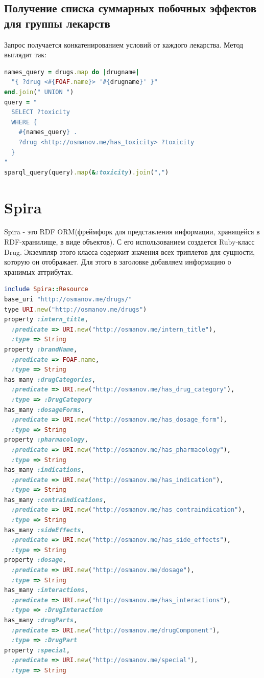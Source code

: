 \documentclass[specialist,subf,href,colorlinks=true
]{disser}
\begin{document}
\subsection{Получение списка суммарных побочных эффектов для группы лекарств}
Запрос получается конкатенированием условий от каждого лекарства. Метод выглядит так:
\begin{lstlisting}[language=Ruby]
names_query = drugs.map do |drugname|
  "{ ?drug <#{FOAF.name}> '#{drugname}' }"
end.join(" UNION ")
query = "
  SELECT ?toxicity
  WHERE {
    #{names_query} .
    ?drug <http://osmanov.me/has_toxicity> ?toxicity
  }
"
sparql_query(query).map(&:toxicity).join(",")
\end{lstlisting}

\section{Spira}
Spira - это RDF ORM(фреймфорк для представления информации, хранящейся в RDF-хранилище, в виде объектов). \cite{spira}
С его использованием создается Ruby-класс Drug. Экземпляр этого класса содержит значения всех триплетов для сущности, которую он отображает.
Для этого в заголовке добавляем информацию о хранимых аттрибутах.
\begin{lstlisting}[language=Ruby]
include Spira::Resource
base_uri "http://osmanov.me/drugs/"
type URI.new("http://osmanov.me/drugs")
property :intern_title, 
  :predicate => URI.new("http://osmanov.me/intern_title"), 
  :type => String
property :brandName,  
  :predicate => FOAF.name, 
  :type => String
has_many :drugCategories, 
  :predicate => URI.new("http://osmanov.me/has_drug_category"), 
  :type => :DrugCategory
has_many :dosageForms, 
  :predicate => URI.new("http://osmanov.me/has_dosage_form"),
  :type => String
property :pharmacology, 
  :predicate => URI.new("http://osmanov.me/has_pharmacology"), 
  :type => String
has_many :indications, 
  :predicate => URI.new("http://osmanov.me/has_indication"), 
  :type => String
has_many :contraindications, 
  :predicate => URI.new("http://osmanov.me/has_contraindication"), 
  :type => String
has_many :sideEffects, 
  :predicate => URI.new("http://osmanov.me/has_side_effects"), 
  :type => String
property :dosage, 
  :predicate => URI.new("http://osmanov.me/dosage"), 
  :type => String
has_many :interactions, 
  :predicate => URI.new("http://osmanov.me/has_interactions"), 
  :type => :DrugInteraction
has_many :drugParts, 
  :predicate => URI.new("http://osmanov.me/drugComponent"), 
  :type => :DrugPart
property :special, 
  :predicate => URI.new("http://osmanov.me/special"), 
  :type => String
\end{lstlisting}
\end{document}
